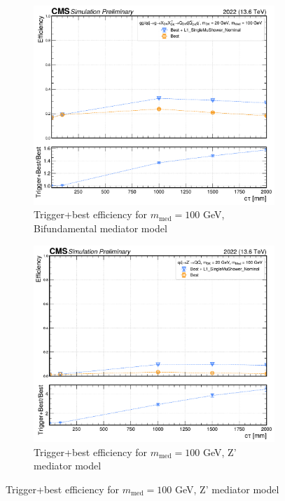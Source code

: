\begin{figure}[h]
  \vspace{1em}

  \begin{subfigure}[t]{0.45\textwidth}
    \centering
    \includegraphics[width=\linewidth]{images/L1/llp_1D_tchan/trigeffplots1D_L1_efftype-trigplusbest_t-channel_mDark-20_mMed-100_L1_SingleMuShower_Nominal_study_cloppear.pdf}
    \caption{Trigger+best efficiency for $m_\mathrm{med} = 100$ GeV, Bifundamental mediator model}
    \label{fig:mus_eff1D_mmed100_tchan}
  \end{subfigure}
  \hfill
  \begin{subfigure}[t]{0.45\textwidth}
    \centering
    \includegraphics[width=\linewidth]{images/L1/llp_1D_schan/trigeffplots1D_L1_efftype-trigplusbest_s-channel_mDark-20_mMed-100_L1_SingleMuShower_Nominal_study_cloppear.pdf}
    \caption{Trigger+best efficiency for $m_\mathrm{med} = 100$ GeV, Z' mediator model}
    \label{fig:mus_eff1D_mmed100_schan}
  \end{subfigure}


\end{figure}
